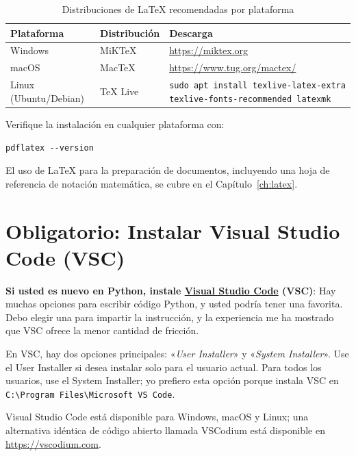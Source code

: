 \begin{table}[htbp]
\centering
\caption{Distribuciones de \LaTeX{} recomendadas por plataforma}
\label{tab:latex-distros}
\begin{tabular}{llp{7.5cm}}
\toprule
\textbf{Plataforma} & \textbf{Distribución} & \textbf{Descarga} \\
\midrule
Windows & MiKTeX & \url{https://miktex.org} \\
macOS & MacTeX & \url{https://www.tug.org/mactex/} \\
Linux (Ubuntu/Debian) & TeX Live & \texttt{sudo apt install texlive-latex-extra texlive-fonts-recommended latexmk} \\
\bottomrule
\end{tabular}
\end{table}

Verifique la instalación en cualquier plataforma con:

\begin{verbatim}
pdflatex --version
\end{verbatim}

\vs
\noindent
El uso de \LaTeX{} para la preparación de documentos, incluyendo una hoja
de referencia de notación matemática, se cubre en el Capítulo~\ref{ch:latex}.
\vs

\section{Obligatorio: Instalar Visual Studio Code (VSC)}\label{sec:vsc}

\textbf{Si usted es nuevo en Python, instale \href{https://code.visualstudio.com}{Visual Studio Code} (VSC)}: Hay muchas opciones para escribir código Python, y usted podría tener una favorita. Debo elegir una para impartir la instrucción, y la experiencia me ha mostrado que VSC ofrece la menor cantidad de fricción.

\vs

En VSC, hay dos opciones principales: «\textit{User Installer}» y «\textit{System Installer}». Use el User Installer si desea instalar solo para el usuario actual. Para todos los usuarios, use el System Installer; yo prefiero esta opción porque instala VSC en \texttt{C:\textbackslash Program Files\textbackslash Microsoft VS Code}.

\vs

Visual Studio Code está disponible para Windows, macOS y Linux; una alternativa idéntica de código abierto llamada VSCodium está disponible en \url{https://vscodium.com}.

